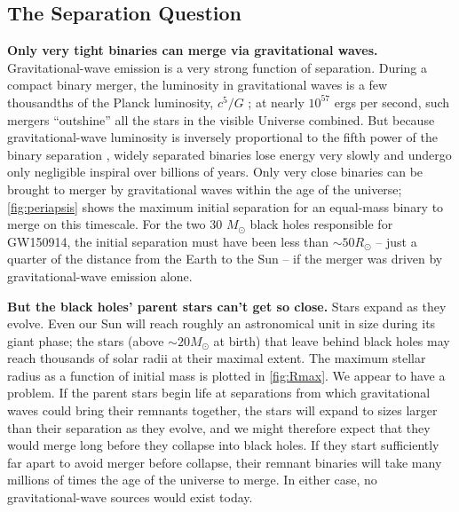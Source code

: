 \documentclass[iop,onecolumn]{revtex4}
\begin{document}
\subsection{The Separation Question}



\textbf{Only very tight binaries can merge via gravitational waves.} Gravitational-wave emission is a very strong function of separation. During a compact binary merger, the luminosity in gravitational waves is a few thousandths of the Planck luminosity, $c^5/G$ \citep[e.g.,][]{Cardoso:2018}; at nearly $10^{57}$ ergs per second, such mergers ``outshine'' all the stars in the visible Universe combined. But because gravitational-wave luminosity is inversely proportional to the fifth power of the binary separation \citep{Peters:1964}, widely separated binaries lose energy very slowly and undergo only negligible inspiral over billions of years. Only very close binaries can be brought to merger by gravitational waves within the age of the universe; \autoref{fig:periapsis} shows the maximum initial separation for an equal-mass binary to merge on this timescale. For the two 30 $M_\odot$ black holes responsible for GW150914, the initial separation must have been less than $\sim 50 R_\odot$ -- just a quarter of the distance from the Earth to the Sun -- if the merger was driven by gravitational-wave emission alone.


\textbf{But the black holes' parent stars can't get so close.} Stars expand as they evolve. Even our Sun will reach roughly an astronomical unit in size during its giant phase; the stars (above $\sim 20 M_\odot$  at birth) that leave behind black holes may reach thousands of solar radii at their maximal extent. The maximum stellar radius as a function of initial mass is plotted in \autoref{fig:Rmax}. We appear to have a problem. If the parent stars begin life at separations from which gravitational waves could bring their remnants together, the stars will expand to sizes larger than their separation as they evolve, and we might therefore expect that they would merge long before they collapse into black holes. If they start sufficiently far apart to avoid merger before collapse, their remnant binaries will take many millions of times the age of the universe to merge. In either case, no gravitational-wave sources would exist today. 
\end{document}
